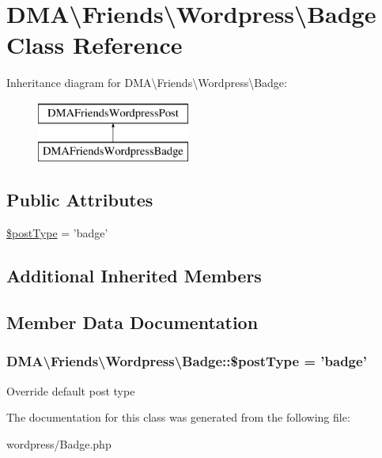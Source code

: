 \hypertarget{classDMA_1_1Friends_1_1Wordpress_1_1Badge}{\section{D\-M\-A\textbackslash{}Friends\textbackslash{}Wordpress\textbackslash{}Badge Class Reference}
\label{classDMA_1_1Friends_1_1Wordpress_1_1Badge}
}
Inheritance diagram for D\-M\-A\textbackslash{}Friends\textbackslash{}Wordpress\textbackslash{}Badge\-:\begin{figure}[H]
\begin{center}
\leavevmode
\includegraphics[height=2.000000cm]{d8/d3a/classDMA_1_1Friends_1_1Wordpress_1_1Badge}
\end{center}
\end{figure}
\subsection*{Public Attributes}
\begin{DoxyCompactItemize}
\item 
\hyperlink{classDMA_1_1Friends_1_1Wordpress_1_1Badge_a3044aa841b86f76868023889de4ca114}{\$post\-Type} = 'badge'
\end{DoxyCompactItemize}
\subsection*{Additional Inherited Members}


\subsection{Member Data Documentation}
\hypertarget{classDMA_1_1Friends_1_1Wordpress_1_1Badge_a3044aa841b86f76868023889de4ca114}{
\subsubsection[{\$post\-Type}]{\setlength{\rightskip}{0pt plus 5cm}D\-M\-A\textbackslash{}\-Friends\textbackslash{}\-Wordpress\textbackslash{}\-Badge\-::\$post\-Type = 'badge'}}\label{classDMA_1_1Friends_1_1Wordpress_1_1Badge_a3044aa841b86f76868023889de4ca114}
Override default post type 

The documentation for this class was generated from the following file\-:\begin{DoxyCompactItemize}
\item 
wordpress/Badge.\-php\end{DoxyCompactItemize}
